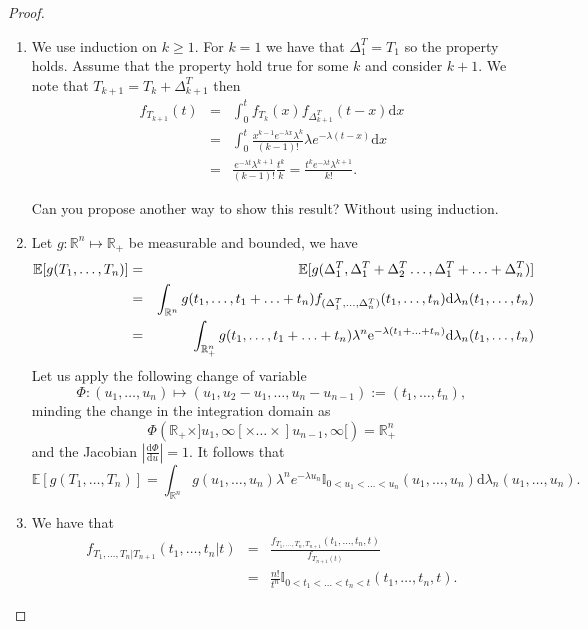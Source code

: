 \begin{proof}
\begin{enumerate}
\item We use induction on $k\geq1$. For $k=1$ we have that $\Delta^T_1= T_1$ so the property holds. Assume that the property hold true for some $k$ and consider $k+1$. We note that $T_{k+1}=T_k+\Delta^T_{k+1}$ then
\begin{eqnarray*}
f_{T_{k+1}}(t)&=&\int_{0}^{t}f_{T_k}(x)f_{\Delta^T_{k+1}}(t-x)\text{d}x\\
&=&\int_{0}^{t}\frac{x^{k-1}e^{-\lambda x}\lambda^k}{(k-1)!}\lambda e^{-\lambda(t-x)}\text{d}x\\
&=&\frac{e^{-\lambda t}\lambda^{k+1}}{(k-1)!}\frac{t^k}{k}=\frac{t^k e^{-\lambda t}\lambda^{k+1}}{k!}.
\end{eqnarray*}
\begin{exercise}
Can you propose another way to show this result? Without using induction.
\end{exercise}
\item Let $g:\mathbb{R}^n\mapsto \mathbb{R}_+$ be measurable and bounded, we have
\begin{eqnarray*}
\mathbb{E}[g(T_{1},\ldots,T_n)]&=& \mathbb{E}[g(\Delta^T_{1},\Delta^T_1+\Delta^T_2\ldots,\Delta^T_1+\ldots+ \Delta^T_n)]\\
&=&\int_{\mathbb{R}^n}g(t_{1},\ldots,t_1+\ldots+ t_n)f_{(\Delta^T_{1},\ldots,\Delta^T_n)}(t_1,\ldots,t_n)\text{d}\lambda_n(t_{1},\ldots,t_n)\\
&=&\int_{\mathbb{R}_+^n}g(t_{1},\ldots,t_1+\ldots+ t_n)\lambda^n\mathrm{e}^{-\lambda(t_1+\ldots+t_n)}\text{d}\lambda_n(t_{1},\ldots,t_n)\\
\end{eqnarray*}
Let us apply the following change of variable 
$$
\Phi:(u_{1},\ldots,u_n)\mapsto(u_1, u_{2}-u_1,\ldots,u_n-u_{n-1}):=(t_1,\ldots, t_n),$$
minding the change in the integration domain as 
$$
\Phi(\mathbb{R}_+\times ]u_1,\infty[\times \ldots\times ]u_{n-1},\infty[) = \mathbb{R}^n_+ 
$$
and the Jacobian $\left|\frac{\text{d}\Phi}{\text{d}u}\right|=1$. It follows that
$$
\mathbb{E}[g(T_{1},\ldots,T_n)]=\int_{\mathbb{R}^n} g(u_1,\ldots, u_n)\lambda^{n}e^{-\lambda u_n}\mathbb{I}_{0<u_1<\ldots<u_n}(u_1,\ldots, u_n)\text{d}\lambda_{n}(u_1,\ldots, u_n).
$$
\item We have that 
\begin{eqnarray*}
f_{T_1,\ldots, T_n|T_{n+1}}(t_1,\ldots,t_n|t)
&=&\frac{f_{T_1,\ldots, T_n,T_{n+1}}(t_1,\ldots,t_n,t)}{f_{T_{n+1}(t)}}\\
&=&\frac{n!}{t^n}\mathbb{I}_{0<t_1<\ldots< t_n<t}(t_1,\ldots, t_n, t).
\end{eqnarray*}
\end{enumerate}
\end{proof}
